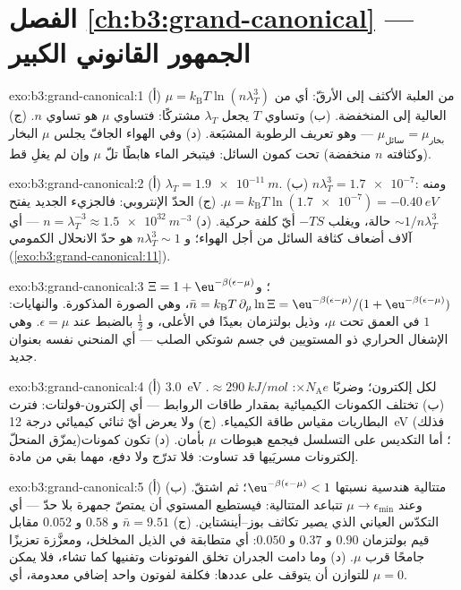 \section*{الفصل \ref{ch:b3:grand-canonical} --- الجمهور القانوني الكبير}

\begin{solution}{exo:b3:grand-canonical:1}
(أ) من العلبة الأكثف إلى الأرقّ: أي من $\mu =
k_{\text{B}}T\ln(n\lambda_T^3)$ العالية إلى المنخفضة. (ب) وتساوي $T$ يجعل
$\lambda_T$ مشتركًا: فتساوي $\mu$ هو تساوي $n$. (ج)
$\mu_{\text{سائل}} = \mu_{\text{بخار}}$ --- وهو تعريف
الرطوبة المشبَعة. (د) وفي الهواء الجافّ يجلس $\mu$ البخار (وكثافته $n$ منخفضة)
تحت كمون السائل: فيتبخر الماء هابطًا تلّ $\mu$
وإن لم يغلِ قط.
\end{solution}

\begin{solution}{exo:b3:grand-canonical:2}
(أ) $\lambda_T = \qty{1.9e-11}{m}$. (ب) $n\lambda_T^3 =
\num{1.7e-7}$: ومنه $\mu = k_{\text{B}}T\ln(\num{1.7e-7}) =
\qty{-0.40}{eV}$. (ج) الحدّ الإنتروبي: فالجزيء الجديد يفتح
$\sim1/n\lambda_T^3$ حالة، ويغلب $-TS$ أيّ كلفة حركية.
(د) $n = \lambda_T^{-3} \approx \qty{1.5e32}{m^{-3}}$ ---
أي آلاف أضعاف كثافة السائل من أجل الهواء؛ و $n\lambda_T^3 \sim 1$
هو حدّ الانحلال الكمومي
(\cref{exo:b3:grand-canonical:11}).
\end{solution}

\begin{solution}{exo:b3:grand-canonical:3}
$\Xi = 1 + \eu^{-\beta(\epsilon-\mu)}$؛ و $\bar n = k_{\text{B}}T\,
\partial_\mu\ln\Xi = \eu^{-\beta(\epsilon-\mu)}/(1 +
\eu^{-\beta(\epsilon-\mu)})$، وهي الصورة المذكورة. والنهايات: $1$ في العمق
تحت $\mu$، وذيل بولتزمان بعيدًا في الأعلى، و $\tfrac12$ بالضبط عند
$\epsilon = \mu$. وهي الإشغال الحراري ذو المستويين في
جسم شوتكي الصلب --- أي المنحني نفسه بعنوان جديد.
\end{solution}

\begin{solution}{exo:b3:grand-canonical:4}
(أ) \qty{3.0}{eV} لكل إلكترون؛ وضربًا $\times N_{\text{A}}e$:
$\approx\qty{290}{kJ/mol}$. (ب) تختلف الكمونات الكيميائية بمقدار طاقات
الروابط --- أي إلكترون-فولتات: فترث البطاريات مقياس طاقة
الكيمياء. (ج) ولا يعرض أيّ ثنائي كيميائي درجة \qty{12}{eV} (فذلك
يمزّق المنحلّ)؛ أما التكديس على التسلسل فيجمع هبوطات $\mu$
بأمان. (د) تكون كمونات إلكترونات مسريَيها قد
تساوت: فلا تدرّج ولا دفع، مهما بقي من مادة.
\end{solution}

\begin{solution}{exo:b3:grand-canonical:5}
(أ) متتالية هندسية نسبتها $\eu^{-\beta(\epsilon-\mu)} < 1$؛
ثم اشتقّ. (ب) وعند $\mu \to \epsilon_{\min}$ تتباعد
المتتالية: فيستطيع المستوي أن يمتصّ جمهرة بلا حدّ --- أي
التكدّس العياني الذي يصير تكاثف بوز--أينشتاين. (ج)
$\bar n = 9.51$ و $0.58$ و $0.052$ مقابل قيم بولتزمان $0.90$ و
$0.37$ و $0.050$: أي متطابقة في الذيل المخلخل، ومعزَّزة تعزيزًا جامحًا
قرب $\mu$. (د) وما دامت الجدران تخلق الفوتونات وتفنيها كما تشاء،
فلا يمكن للتوازن أن يتوقف على عددها: فكلفة 
لفوتون واحد إضافي معدومة، أي $\mu = 0$.
\end{solution}

